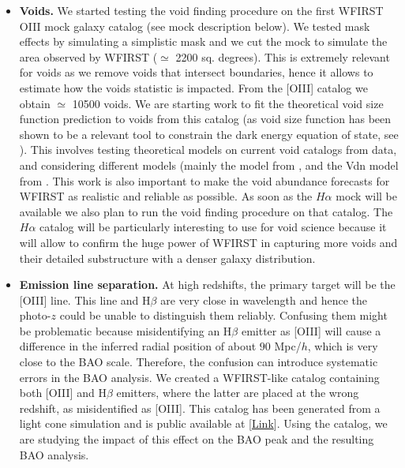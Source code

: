 \begin{itemize}

\item {\bf Voids.} We started testing the void finding procedure on the first
WFIRST OIII mock galaxy catalog (see mock description below). We tested mask
effects by simulating a simplistic mask and we cut the mock to simulate the area
observed by WFIRST ($\simeq$ 2200 sq. degrees). This is extremely relevant for
voids as we remove voids that intersect boundaries, hence it allows to estimate
how the voids statistic is impacted. From the [OIII] catalog we obtain $\simeq$
10500 voids. We are starting work to fit the theoretical void size function
prediction to voids from this catalog (as void size function has been shown to
be a relevant tool to constrain the dark energy equation of state, see
\cite{Pisani2015}). This involves testing theoretical models on current void
catalogs from data, and considering different models (mainly the model from
\cite{Sheth2004}, and the Vdn model from  \cite{Jennings2013}. This work is also
important to make the void abundance forecasts for WFIRST as realistic and
reliable as possible. As soon as the $H\alpha$ mock will be available we also
plan to run the void finding procedure on that catalog. The $H\alpha$ catalog
will be particularly interesting to use for void science because it will allow
to confirm the huge power of WFIRST in capturing more voids and their detailed
substructure with a denser galaxy distribution.

\item {\bf Emission line separation.} At high redshifts, the primary target will
be the [OIII] line. This line and H$\beta$ are very close in wavelength and
hence the photo-$z$ could be unable to distinguish them reliably. Confusing them
might be problematic because misidentifying an H$\beta$ emitter as [OIII] will
cause a difference in the inferred radial position of about $90$ Mpc/$h$, which
is very close to the BAO scale. Therefore, the confusion can introduce
systematic errors in the BAO analysis. We created a WFIRST-like catalog
containing both [OIII] and H$\beta$ emitters, where the latter are placed at the
wrong redshift, as misidentified as [OIII]. This catalog has been generated from a light cone simulation and is public available at
[\href{http://www.wfirst-hls-cosmology.org/products/}{Link}]. Using the catalog,
we are studying the impact of this effect on the BAO peak and the resulting BAO
analysis.


\end{itemize}
